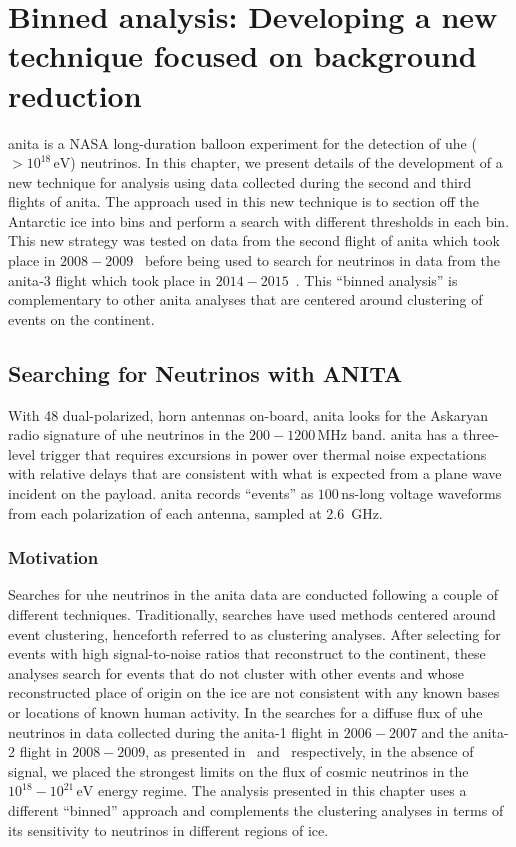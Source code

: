 \chapter{Binned analysis: Developing a new technique focused on background reduction}
\label{analysis}

\gls{anita} is a NASA long-duration balloon experiment for the detection of \gls{uhe} ($>10^{18}\,\mbox{eV}$) neutrinos. 
In this chapter, we present details of the development of a new technique for analysis using data collected during the second and third flights of \gls{anita}.
The approach used in this new technique is to section off the Antarctic ice
into bins and perform a search with different thresholds in each bin.  This new strategy was tested on data from the second flight of \gls{anita} which took place in $2008 - 2009$~\cite{brianDaileyThesis} before being used to search for neutrinos in data from the \gls{anita}-3 flight which took place in $2014 - 2015$~\cite{samStaffordThesis,jacobGordonThesis}.
This ``binned analysis'' is complementary to other \gls{anita} analyses that are centered around clustering of events on the continent.

\section{Searching for Neutrinos with ANITA}
With 48 dual-polarized, horn antennas on-board, \gls{anita} looks for the Askaryan radio signature of \gls{uhe} neutrinos in the $200 - 1200\,\mbox{MHz}$ band.  
\gls{anita} has a three-level trigger that 
requires excursions in power over thermal noise expectations with relative delays that are 
consistent with what is expected from a plane wave incident on the payload.
\gls{anita} records ``events'' as $100\,\mbox{ns}$-long
voltage waveforms from each polarization of each antenna, sampled at 2.6~GHz.

\subsection{Motivation}
\label{motivation}

Searches for \gls{uhe} neutrinos in the \gls{anita} data are conducted following a couple of different techniques. 
Traditionally, searches have used methods centered around event clustering, henceforth referred to as clustering analyses. After selecting for events with high signal-to-noise ratios that reconstruct to the continent, these analyses search for events that do not cluster with other events and whose reconstructed place of origin on the ice are not consistent with any known bases or locations of known human activity.  
In the searches for a diffuse flux of \gls{uhe} neutrinos in data collected during the \gls{anita}-1 flight in $2006 - 2007$ and the \gls{anita}-2 flight in $2008 - 2009$, as presented in~\cite{anita1} and~\cite{anita2} respectively, in the absence of signal, we placed the strongest limits on the flux of cosmic neutrinos in the $10^{18} - 10^{21} \,\mbox{eV}$ energy regime.
The analysis presented in this chapter uses a different ``binned'' approach and complements the clustering analyses in terms of its sensitivity  to neutrinos in different regions of ice.

